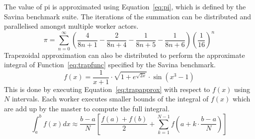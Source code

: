 \documentclass[oneside]{um-fict}
\begin{document}
The value of pi is approximated using Equation~\ref{eq:pi}, which is defined by the Savina benchmark suite. The iterations of the summation can be distributed and parallelised amongst multiple worker actors.
\begin{equation} \label{eq:pi}
\pi=\sum_{n=0}^{\infty}\left(\frac{4}{8n+1}-\frac{2}{8n+4}-\frac{1}{8n+5}-\frac{1}{8n+6}\right) \left(\frac{1}{16} \right)^n
\end{equation}
Trapezoidal approximation can also be distributed to perform the approximate integral of Function~\ref{eq:trapfunc} specified by the Savina benchmark.
\begin{equation} \label{eq:trapfunc}
f(x)=\frac{1}{x+1}\cdot\sqrt{1+e^{\sqrt{2x}}}\cdot \sin\left(x^3-1\right)
\end{equation}
This is done by executing Equation~\ref{eq:trapapprox} with respect to $f(x)$ using $N$ intervals. Each worker executes smaller bounds of the integral of $f(x)$ which are add up by the master to compute the full integral.
\begin{equation} \label{eq:trapapprox}
\int_{a}^{b}f(x)dx\approx\frac{b-a}{N}\left[ \frac{f(a)+f(b)}{2}+\sum_{k=1}^{N-1}f\left( a+k\cdot\frac{b-a}{N} \right) \right]
\end{equation}
\end{document}
